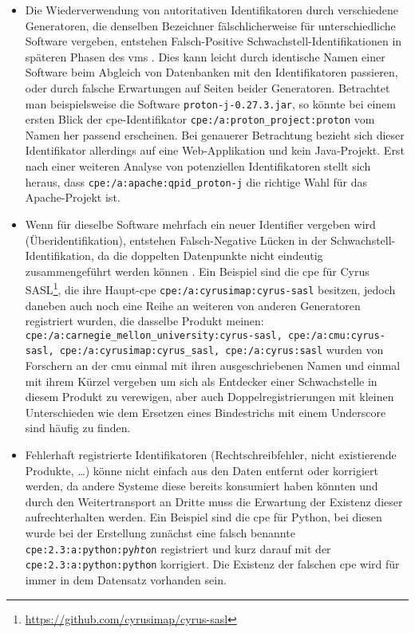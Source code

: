 \begin{itemize}
    \itemsep0em
    \item Die Wiederverwendung von autoritativen Identifikatoren durch verschiedene Generatoren, die denselben Bezeichner fälschlicherweise für unterschiedliche Software vergeben, entstehen Falsch-Positive Schwachstell-Identifikationen in späteren Phasen des \acrshort{vms} \autocite{CISA2023}.
    Dies kann leicht durch identische Namen einer Software beim Abgleich von Datenbanken mit den Identifikatoren passieren, oder durch falsche Erwartungen auf Seiten beider Generatoren.
    Betrachtet man beispielsweise die Software \texttt{proton-j-0.27.3.jar}, so könnte bei einem ersten Blick der \acrshort{cpe}-Identifikator \texttt{cpe:/a:proton\_project:proton} vom Namen her passend erscheinen.
    Bei genauerer Betrachtung bezieht sich dieser Identifikator allerdings auf eine Web-Applikation und kein Java-Projekt.
    Erst nach einer weiteren Analyse von potenziellen Identifikatoren stellt sich heraus, dass \texttt{cpe:/a:apache:qpid\_proton-j} die richtige Wahl für das Apache-Projekt ist.

    \item Wenn für dieselbe Software mehrfach ein neuer Identifier vergeben wird (Überidentifikation), entstehen Falsch-Negative Lücken in der Schwachstell-Identifikation, da die doppelten Datenpunkte nicht eindeutig zusammengeführt werden können \autocite{CISA2023}.
    Ein Beispiel sind die \acrshort{cpe} für Cyrus SASL\footnote{\url{https://github.com/cyrusimap/cyrus-sasl}}, die ihre Haupt-\acrshort{cpe} \texttt{cpe:/a:cyrusimap:cyrus-sasl} besitzen, jedoch daneben auch noch eine Reihe an weiteren von anderen Generatoren registriert wurden, die dasselbe Produkt meinen:
    \texttt{cpe:/a:carnegie\_mellon\_university:cyrus-sasl, cpe:/a:cmu:cyrus-sasl, cpe:/a:cyrusimap:cyrus\_sasl, cpe:/a:cyrus:sasl} wurden von Forschern an der \acrfull{cmu} einmal mit ihren ausgeschriebenen Namen und einmal mit ihrem Kürzel vergeben um sich als Entdecker einer Schwachstelle in diesem Produkt zu verewigen, aber auch Doppelregistrierungen mit kleinen Unterschieden wie dem Ersetzen eines Bindestrichs mit einem Underscore sind häufig zu finden.

    \item Fehlerhaft registrierte Identifikatoren (Rechtschreibfehler, nicht existierende Produkte, \ldots) könne nicht einfach aus den Daten entfernt oder korrigiert werden, da andere Systeme diese bereits konsumiert haben könnten und durch den Weitertransport an Dritte muss die Erwartung der Existenz dieser aufrechterhalten werden.
    Ein Beispiel sind die \acrshort{cpe} für Python, bei diesen wurde bei der Erstellung zunächst eine falsch benannte \texttt{cpe:2.3:a:python:py\textit{ht}on} registriert und kurz darauf mit der \texttt{cpe:2.3:a:python:python} korrigiert.
    Die Existenz der falschen \acrshort{cpe} wird für immer in dem Datensatz vorhanden sein.


\end{itemize}

